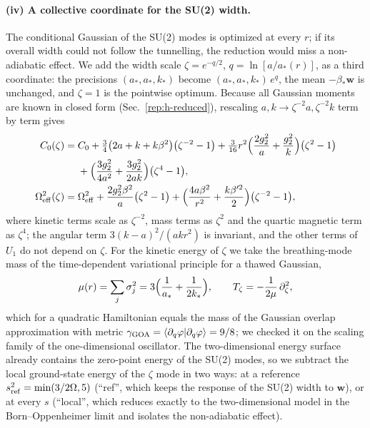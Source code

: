 \paragraph{(iv) A collective coordinate for the SU(2) width.}
The conditional Gaussian of the SU(2) modes is optimized at every $r$; if its overall width could not follow the tunnelling, the reduction would miss a non-adiabatic effect.
We add the width scale $\zeta=e^{-q/2}$, $q=\ln[a/a_*(r)]$, as a third coordinate: the precisions $(a_*,a_*,k_*)$ become $(a_*,a_*,k_*)\,e^{q}$, the mean $-\beta_*\bm w$ is unchanged, and $\zeta=1$ is the pointwise optimum.
Because all Gaussian moments are known in closed form (Sec.~\ref{rep:h-reduced}), rescaling $a,k\to\zeta^{-2}a,\zeta^{-2}k$ term by term gives
\begin{align}
C_0(\zeta)={}&C_0+\tfrac34\bigl(2a+k+k\beta^2\bigr)\bigl(\zeta^{-2}-1\bigr)+\tfrac{3}{16}r^2\Bigl(\frac{2g_2^2}{a}+\frac{g_2^2}{k}\Bigr)\bigl(\zeta^{2}-1\bigr)\nonumber\\
&+\Bigl(\frac{3g_2^2}{4a^2}+\frac{3g_2^2}{2ak}\Bigr)\bigl(\zeta^{4}-1\bigr),\label{eq:v18-C0zeta}\\
\Omega_{\rm eff}^2(\zeta)={}&\Omega_{\rm eff}^2+\frac{2g_2^2\beta^2}{a}\bigl(\zeta^2-1\bigr)+\Bigl(\frac{4a\beta^2}{r^2}+\frac{k\beta'^2}{2}\Bigr)\bigl(\zeta^{-2}-1\bigr),
\label{eq:v18-Omzeta}
\end{align}
where kinetic terms scale as $\zeta^{-2}$, mass terms as $\zeta^{2}$ and the quartic magnetic term as $\zeta^4$; the angular term $3(k-a)^2/(akr^2)$ is invariant, and the other terms of $U_1$ do not depend on $\zeta$.
For the kinetic energy of $\zeta$ we take the breathing-mode mass of the time-dependent variational principle for a thawed Gaussian,
\begin{equation}
\mu(r)=\sum_j\sigma_j^2=3\Bigl(\frac1{a_*}+\frac1{2k_*}\Bigr),\qquad T_\zeta=-\frac{1}{2\mu}\,\partial_\zeta^2,
\label{eq:v18-mu}
\end{equation}
which for a quadratic Hamiltonian equals the mass of the Gaussian overlap approximation with metric $\gamma_{\rm GOA}=\langle\partial_q\varphi|\partial_q\varphi\rangle=9/8$; we checked it on the scaling family of the one-dimensional oscillator. %
The two-dimensional energy surface already contains the zero-point energy of the SU(2) modes, so we subtract the local ground-state energy of the $\zeta$ mode in two ways: at a reference $s_{\rm ref}^2=\min(3/2\Omega,5)$ (``ref'', which keeps the response of the SU(2) width to $\bm w$), or at every $s$ (``local'', which reduces exactly to the two-dimensional model in the Born--Oppenheimer limit and isolates the non-adiabatic effect).
